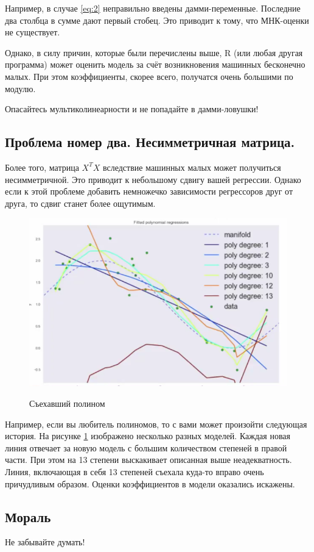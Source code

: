 \documentclass[12pt, a4paper]{article}
\begin{document}
Например, в случае \eqref{eq:2} неправильно введены дамми-переменные. Последние два столбца в сумме дают первый стобец. Это приводит к тому, что МНК-оценки не существует. 

Однако, в силу причин, которые были перечислены выше, R (или любая другая программа) может оценить модель за счёт возникновения машинных бесконечно малых. При этом коэффициенты, скорее всего, получатся очень большими по модулю. 

Опасайтесь мультиколинеарности и не попадайте в дамми-ловушки! 

\subsection{Проблема номер два. Несимметричная матрица.}

Более того, матрица $X^T X$ вследствие машинных малых может получиться несимметричной. Это приводит к небольшому сдвигу вашей регрессии. Однако если к этой проблеме добавить немножечко зависимости регрессоров друг от друга, то сдвиг станет более ощутимым.


\begin{figure}[H] 
\includegraphics[scale=0.6]{polinom.png} \label{pic:1}
\caption{Съехавший полином}
\end{figure}

Например, если вы любитель полиномов, то с вами может произойти следующая история. На рисунке \ref{pic:1} изображено несколько разных моделей. Каждая новая линия отвечает за новую модель с большим количеством степеней в правой части. При этом на 13 степени выскакивает описанная выше неадекватность. Линия, включающая в себя 13 степеней съехала куда-то вправо очень причудливым образом. Оценки коэффициентов в модели оказались искажены. 

\subsection{Мораль} 

Не забывайте думать! 
\end{document}
